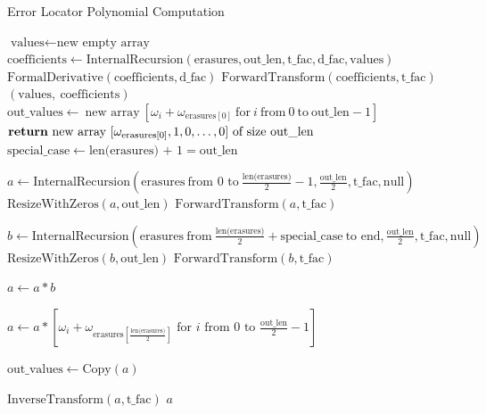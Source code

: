 \begin{algorithm}[!hbt]
    \caption{Error Locator Polynomial Computation}
    \begin{algorithmic}
            \State $\text{values} \gets \text{new empty array}$
            \State $\text{coefficients} \gets \text{InternalRecursion}(\text{erasures}, \text{out\_len}, \text{t\_fac}, \text{d\_fac}, \text{values})$
            \State $\text{FormalDerivative}(\text{coefficients}, \text{d\_fac})$
            \State $\text{ForwardTransform}(\text{coefficients}, \text{t\_fac})$
            \State \Return $(\text{values},\ \text{coefficients})$ 
        \EndFunction
                    \State $\text{out\_values} \gets\ \text{new array}\ [\omega_i + \omega_{\text{erasures}[0]}\ \text{for}\ i\ \text{from}\ 0\ \text{to}\ \text{out\_len} - 1]$
                \EndIf
                \State $\Return\ \text{new array}\ [\omega_{\text{erasures}[0]}, 1, 0, \ldots, 0]\ \text{of size}\ \text{out\_len}$
            \EndIf
            \State $\text{special\_case} \gets \text{len(erasures) + 1} = \text{out\_len}$

            \State $a \gets \text{InternalRecursion}(\text{erasures}\ \text{from 0 to}\ \frac{\text{len(erasures)}}{2} - 1 , \frac{\text{out\_len}}{2}, \text{t\_fac}, \text{null})$
            \State $\text{ResizeWithZeros}(a, \text{out\_len})$
            \State $\text{ForwardTransform}(a, \text{t\_fac})$

            \State $b \gets \text{InternalRecursion}(\text{erasures}\ \text{from}\ \frac{\text{len(erasures)}}{2} + \text{special\_case}\ \text{to end}, \frac{\text{out\_len}}{2}, \text{t\_fac}, \text{null})$
            \State $\text{ResizeWithZeros}(b, \text{out\_len})$
            \State $\text{ForwardTransform}(b, \text{t\_fac})$

            \State $a \gets a * b$ 

                \State $a \gets a * [\omega_i + \omega_{\text{erasures}[\frac{\text{len(erasures)}}{2}]} \text{ for } i \text{ from } 0 \text{ to } \frac{\text{out\_len}}{2} - 1]$
            \EndIf

             
                \State $\text{out\_values} \gets \text{Copy}(a)$ 
            \EndIf

            \State $\text{InverseTransform}(a, \text{t\_fac})$ 
            \State \Return $a$
        \EndFunction
    \end{algorithmic}
\end{algorithm}


